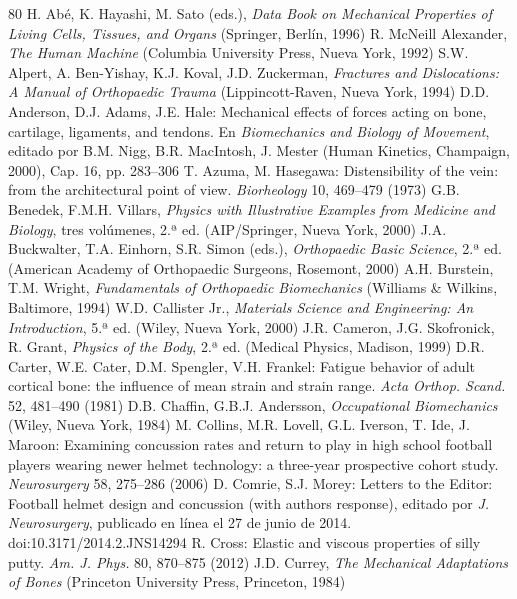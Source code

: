 \documentclass[12pt]{book}
\begin{document}
\begin{thebibliography}{80}
   H. Abé, K. Hayashi, M. Sato (eds.), \textit{Data Book on Mechanical Properties of Living Cells, Tissues, and Organs} (Springer, Berlín, 1996)
   R. McNeill Alexander, \textit{The Human Machine} (Columbia University Press, Nueva York, 1992)
   S.W. Alpert, A. Ben-Yishay, K.J. Koval, J.D. Zuckerman, \textit{Fractures and Dislocations: A Manual of Orthopaedic Trauma} (Lippincott-Raven, Nueva York, 1994)
   D.D. Anderson, D.J. Adams, J.E. Hale: Mechanical effects of forces acting on bone, cartilage, ligaments, and tendons. En \textit{Biomechanics and Biology of Movement}, editado por B.M. Nigg, B.R. MacIntosh, J. Mester (Human Kinetics, Champaign, 2000), Cap. 16, pp. 283--306
   T. Azuma, M. Hasegawa: Distensibility of the vein: from the architectural point of view. \textit{Biorheology} 10, 469--479 (1973)
   G.B. Benedek, F.M.H. Villars, \textit{Physics with Illustrative Examples from Medicine and Biology}, tres volúmenes, 2.ª ed. (AIP/Springer, Nueva York, 2000)
   J.A. Buckwalter, T.A. Einhorn, S.R. Simon (eds.), \textit{Orthopaedic Basic Science}, 2.ª ed. (American Academy of Orthopaedic Surgeons, Rosemont, 2000)
   A.H. Burstein, T.M. Wright, \textit{Fundamentals of Orthopaedic Biomechanics} (Williams \& Wilkins, Baltimore, 1994)
   W.D. Callister Jr., \textit{Materials Science and Engineering: An Introduction}, 5.ª ed. (Wiley, Nueva York, 2000)
   J.R. Cameron, J.G. Skofronick, R. Grant, \textit{Physics of the Body}, 2.ª ed. (Medical Physics, Madison, 1999)
   D.R. Carter, W.E. Cater, D.M. Spengler, V.H. Frankel: Fatigue behavior of adult cortical bone: the influence of mean strain and strain range. \textit{Acta Orthop. Scand.} 52, 481--490 (1981)
   D.B. Chaffin, G.B.J. Andersson, \textit{Occupational Biomechanics} (Wiley, Nueva York, 1984)
   M. Collins, M.R. Lovell, G.L. Iverson, T. Ide, J. Maroon: Examining concussion rates and return to play in high school football players wearing newer helmet technology: a three-year prospective cohort study. \textit{Neurosurgery} 58, 275--286 (2006)
   D. Comrie, S.J. Morey: Letters to the Editor: Football helmet design and concussion (with authors response), editado por \textit{J. Neurosurgery}, publicado en línea el 27 de junio de 2014. doi:10.3171/2014.2.JNS14294
   R. Cross: Elastic and viscous properties of silly putty. \textit{Am. J. Phys.} 80, 870--875 (2012)
   J.D. Currey, \textit{The Mechanical Adaptations of Bones} (Princeton University Press, Princeton, 1984)

\end{thebibliography}
\end{document}
